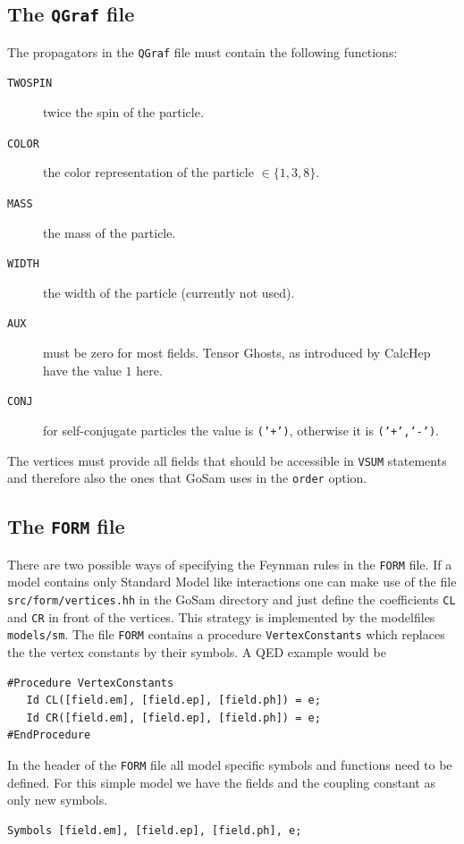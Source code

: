 \documentclass[11pt,a4paper]{refrep}
\newcommand{\gosamversion}{{2{.}0}}
\newcommand{\gosamv}[1][\gosamversion]{{\sc GoSam}\xspace}
\newcommand{\qgraf}{{\tt QGraf}\xspace}
\newcommand{\form}{{\tt FORM}\xspace}
\begin{document}
\subsection{The \qgraf{} file}
The propagators in the \qgraf{} file must contain the following functions:
\begin{description}
\item[\texttt{TWOSPIN}] twice the spin of the particle.
\item[\texttt{COLOR}]   the color representation of the particle $\in\{1,3,8\}$.
\item[\texttt{MASS}]    the mass of the particle.
\item[\texttt{WIDTH}]   the width of the particle (currently not used).
\item[\texttt{AUX}]     must be zero for most fields. Tensor Ghosts, as introduced
                        by CalcHep have the value $1$ here.
\item[\texttt{CONJ}]    for self-conjugate particles the value is \texttt{('+')},
                        otherwise it is \texttt{('+','-')}.
\end{description}

The vertices must provide all fields that should be accessible in \texttt{VSUM} statements
and therefore also the ones that \gosamv{} uses in the \texttt{order} option.

\subsection{The \form{} file}
There are two possible ways of specifying the Feynman rules in the \form{} file.
If a model contains only Standard Model like interactions one can make use of
the file \texttt{src/form/vertices.hh} in the \gosamv{} directory and just define
the coefficients \texttt{CL} and \texttt{CR} in front of the vertices. This
strategy is implemented by the modelfiles \texttt{models/sm}. The file
\form{} contains a procedure \texttt{VertexConstants} which
replaces the the vertex constants by their symbols. A QED example would be
\begin{lstlisting}[language=form]
#Procedure VertexConstants
   Id CL([field.em], [field.ep], [field.ph]) = e;
   Id CR([field.em], [field.ep], [field.ph]) = e;
#EndProcedure
\end{lstlisting}
In the header of the \form{} file all model specific
symbols and functions need to be defined. For this simple
model we have the fields and the coupling constant as only
new symbols.
\begin{lstlisting}[language=form]
Symbols [field.em], [field.ep], [field.ph], e;
\end{lstlisting}
\end{document}
